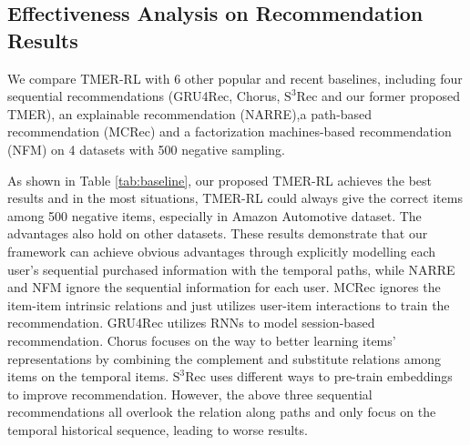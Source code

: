 \subsection{Effectiveness Analysis on Recommendation Results}
\label{subsec:baseline}
We compare TMER-RL with 6 other popular and recent baselines, including four sequential recommendations (GRU4Rec, Chorus,  $\mathrm{S^3Rec}$ and our former proposed TMER), an explainable recommendation (NARRE),a path-based recommendation (MCRec) and a factorization machines-based recommendation (NFM) on 4 datasets with 500 negative sampling. 

As shown in Table \ref{tab:baseline}, our proposed TMER-RL achieves the best results and in the most situations, TMER-RL could always give the correct items among 500 negative items, especially in Amazon Automotive dataset. The advantages also hold on other datasets. These results demonstrate that our framework can achieve obvious advantages through explicitly modelling each user’s sequential purchased information with the temporal paths, while NARRE and NFM ignore the sequential information for each user. MCRec ignores the item-item intrinsic relations and just utilizes user-item interactions to train the recommendation. GRU4Rec utilizes RNNs to model session-based recommendation. Chorus focuses on the way to better learning items' representations by combining the complement and substitute relations among items on the temporal items. $\mathrm{S^3Rec}$ uses different ways to pre-train embeddings to improve recommendation. However, the above three sequential recommendations all overlook the relation along paths and only focus on the temporal historical sequence, leading to worse results.

